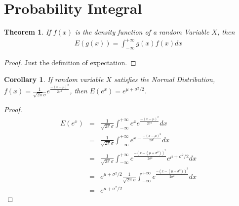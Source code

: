 \documentclass[12pt]{article}
\newtheorem{theorem}{Theorem}[section]
\newtheorem{corollary}{Corollary}[theorem]
\begin{document}
\section{Probability Integral}
\begin{theorem}
	If $f(x)$ is the density function of a random Variable $X$, then 
	\begin{eqnarray}
		E(g(x)) = \int_{-\infty}^{+\infty}g(x)f(x) dx
	\end{eqnarray}
\end{theorem}
\begin{proof}
	Just the definition of expectation. 
\end{proof}
\begin{corollary}
	If random variable $X$ satisfies the Normal Distribution, $f(x) = \frac{1}{\sqrt{2\pi}\sigma}e^{\frac{-(x-\mu)^2}{2\sigma^2}}$, then $E(e^x)=e^{\mu+\sigma^2/2}$.
\end{corollary}
\begin{proof}
\begin{eqnarray*}
	E(e^x)&=&\frac{1}{\sqrt{2\pi}\sigma}\int_{-\infty}^{+\infty}e^xe^{\frac{-(x-\mu)^2}{2\sigma^2}}dx\\
	&=&\frac{1}{\sqrt{2\pi}\sigma}\int_{-\infty}^{+\infty}e^{x+\frac{-(x-\mu)^2}{2\sigma^2}}dx\\
	&=&\frac{1}{\sqrt{2\pi}\sigma}\int_{-\infty}^{+\infty}e^{\frac{-\left(x-(\mu+\sigma^2)\right)^2}{2\sigma^2}}e^{\mu+\sigma^2/2}dx\\
	&=&e^{\mu+\sigma^2/2}\frac{1}{\sqrt{2\pi}\sigma}\int_{-\infty}^{+\infty}e^{\frac{-\left(x-(\mu+\sigma^2)\right)^2}{2\sigma^2}}dx\\
	&=&e^{\mu+\sigma^2/2}
\end{eqnarray*}
\end{proof}
\end{document}
